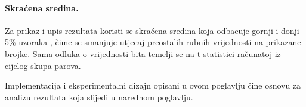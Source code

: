 \paragraph{Skraćena sredina.}
Za prikaz i upis rezultata koristi se skraćena sredina koja odbacuje gornji i donji 5\% uzoraka \cite{wilcox2005}, čime se smanjuje utjecaj preostalih rubnih vrijednosti na prikazane brojke. Sama odluka o vrijednosti bita temelji se na t-statistici računatoj iz cijelog skupa parova.

Implementacija i eksperimentalni dizajn opisani u ovom poglavlju čine osnovu za analizu rezultata koja slijedi u narednom poglavlju.
